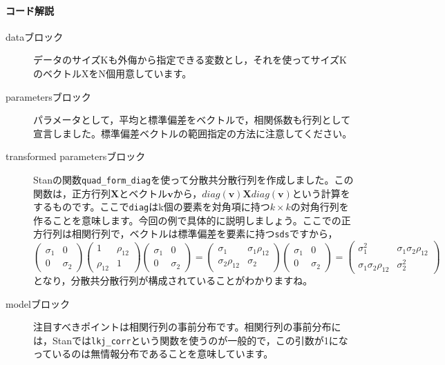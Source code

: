 \documentclass{ltjsbook}
\begin{document}
\paragraph{コード解説}
\begin{description}
	\item[dataブロック] データのサイズKも外侮から指定できる変数とし，それを使ってサイズKのベクトルXをN個用意しています。
	\item[parametersブロック] パラメータとして，平均と標準偏差をベクトルで，相関係数も行列として宣言しました。標準偏差ベクトルの範囲指定の方法に注意してください。
	\item[transformed parametersブロック] Stanの関数\verb|quad_form_diag|を使って分散共分散行列を作成しました。この関数は，正方行列$\bm{X}$とベクトル$\bm{v}$から，$diag(\bm{v}) \bm{X} diag(\bm{v})$という計算をするものです。ここで\verb|diag|はk個の要素を対角項に持つ$k \times k$の対角行列を作ることを意味します。今回の例で具体的に説明しましょう。ここでの正方行列は相関行列で，ベクトルは標準偏差を要素に持つ\verb|sds|ですから，
	      \[ \begin{pmatrix}\sigma_1&0\\0&\sigma_2\end{pmatrix}\begin{pmatrix}1&\rho_{12}\\\rho_{12}&1\end{pmatrix}\begin{pmatrix}\sigma_1&0\\0&\sigma_2\end{pmatrix} =
		      \begin{pmatrix} \sigma_1 & \sigma_1\rho_{12}\\ \sigma_2\rho_{12} & \sigma_2\end{pmatrix}\begin{pmatrix}\sigma_1 & 0\\ 0 & \sigma_2\end{pmatrix} =
		      \begin{pmatrix}\sigma_1^2 & \sigma_1\sigma_2\rho_{12} \\ \sigma_1\sigma_2\rho_{12} & \sigma_2^2\end{pmatrix} \]
	      となり，分散共分散行列が構成されていることがわかりますね。
	\item[modelブロック] 注目すべきポイントは相関行列の事前分布です。相関行列の事前分布には，Stanでは\verb|lkj_corr|という関数を使うのが一般的で，この引数が1になっているのは無情報分布であることを意味しています。
\end{description}
\end{document}
